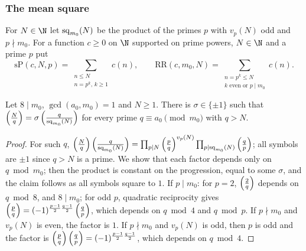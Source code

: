 \subsubsection{The mean square}

\begin{definition}\label{pf:top-supply:sPRR}
For $N\in\N$ let $\operatorname{sq}_{m_0}(N)$ be the product of the primes $p$ with $v_p(N)$ odd and $p\nmid m_0$.
For a function $c\ge0$ on $\N$ supported on prime powers, $N\in\N$ and a prime $p$ put
\[
\mathrm{sP}(c,N,p)=\sum_{\substack{n\le N\\ n=p^k,\,k\ge1}}c(n),\qquad
\mathrm{RR}(c,m_0,N)=\sum_{\substack{n=p^k\le N\\ k\text{ even or }p\mid m_0}}c(n).
\]
\end{definition}

\begin{lemma}[Reciprocity]\label{pf:top-supply:jacclass}
Let $8\mid m_0$, $\gcd(a_0,m_0)=1$ and $N\ge1$. There is $\sigma\in\{\pm1\}$ such that
$\left(\frac{N}{q}\right)=\sigma\left(\frac{q}{\operatorname{sq}_{m_0}(N)}\right)$ for every prime $q\equiv a_0\pmod{m_0}$ with $q>N$.
\end{lemma}

\begin{proof}
For such $q$, $\left(\frac{N}{q}\right)\left(\frac{q}{\operatorname{sq}_{m_0}(N)}\right)=\prod_{p\mid N}\left(\frac{p}{q}\right)^{v_p(N)}
\prod_{p\mid\operatorname{sq}_{m_0}(N)}\left(\frac{q}{p}\right)$; all symbols are $\pm1$ since $q>N$ is a prime. We show that each
factor depends only on $q\bmod m_0$; then the product is constant on the progression, equal to some $\sigma$, and the
claim follows as all symbols square to $1$. If $p\mid m_0$: for $p=2$, $\left(\frac{2}{q}\right)$ depends on $q\bmod8$, and
$8\mid m_0$; for odd $p$, quadratic reciprocity gives $\left(\frac{p}{q}\right)=(-1)^{\frac{p-1}2\frac{q-1}2}\left(\frac{q}{p}\right)$,
which depends on $q\bmod4$ and $q\bmod p$. If $p\nmid m_0$ and $v_p(N)$ is even, the factor is $1$. If $p\nmid m_0$
and $v_p(N)$ is odd, then $p$ is odd and the factor is $\left(\frac{p}{q}\right)\left(\frac{q}{p}\right)=(-1)^{\frac{p-1}2\frac{q-1}2}$,
which depends on $q\bmod4$.
\end{proof}

